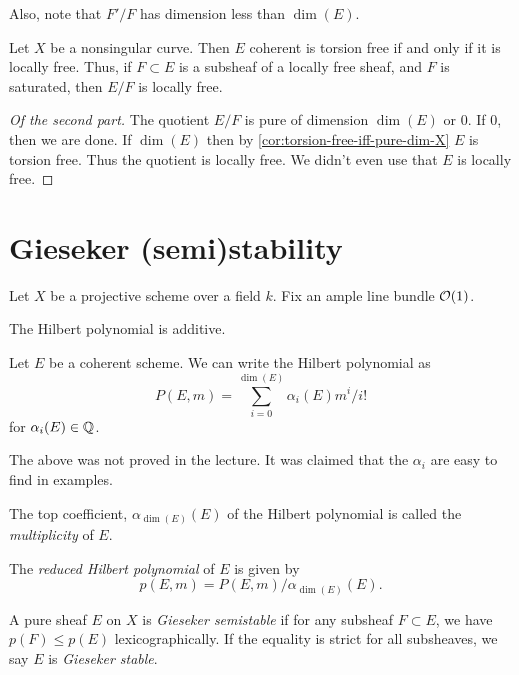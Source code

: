 Also, note that $F'/F$ has dimension less than $\dim(E)$. 
\begin{problem}
	Let $X$ be a nonsingular curve. Then $E$ coherent is torsion free if and only if it is locally free. Thus, if $F \subset E$ is a subsheaf of a locally free sheaf, and $F$ is saturated, then $E/F$ is locally free. 
\end{problem}
\begin{proof}[Of the second part]
	The quotient $E/F$ is pure of dimension $\dim(E)$ or $0$. If $0$, then we are done. If $\dim(E)$ then by \cref{cor:torsion-free-iff-pure-dim-X} $E$ is torsion free. Thus the quotient is locally free. We didn't even use that $E$ is locally free. 
\end{proof}

\section{Gieseker (semi)stability}
Let $X$ be a projective scheme over a field $k$. Fix an ample line bundle $\mathcal{O}(1)$. 

\begin{proposition}
	The Hilbert polynomial is additive.
\end{proposition}

\begin{proposition}
	Let $E$ be a coherent scheme. We can write the Hilbert polynomial as \[
    	P(E, m) = \sum_{i=0}^{\dim(E)} \alpha_i(E) m^i/i!
    \] for $\alpha_i(E) \in \mathbb{Q}$.
\end{proposition}
The above was not proved in the lecture. It was claimed that the $\alpha_i$ are easy to find in examples.
\begin{definition}
	The top coefficient, $\alpha_{\dim(E)}(E)$ of the Hilbert polynomial is called the \emph{multiplicity} of $E$. 
\end{definition}

\begin{definition}
	The \emph{reduced Hilbert polynomial} of $E$ is given by \[p(E,m) = P(E,m)/\alpha_{\dim(E)}(E).\]
\end{definition}

\begin{definition}
	A pure sheaf $E$ on $X$ is \emph{Gieseker semistable} if for any subsheaf $F \subset E$, we have $p(F) \leq p(E)$ lexicographically. If the equality is strict for all subsheaves, we say $E$ is \emph{Gieseker stable}.
\end{definition}

